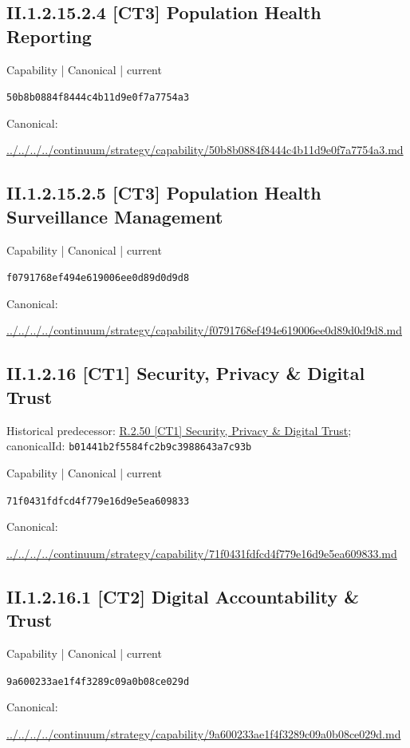 \documentclass[10pt,a4paper]{article}
\begin{document}
\subsection*{II.1.2.15.2.4 [CT3] Population Health Reporting}
\label{element-50b8b0884f8444c4b11d9e0f7a7754a3}
{\small Capability | Canonical | current}\par
\texttt{50b8b0884f8444c4b11d9e0f7a7754a3}\par
Canonical: \par
{\footnotesize\url{../../../../continuum/strategy/capability/50b8b0884f8444c4b11d9e0f7a7754a3.md}}\par
\subsection*{II.1.2.15.2.5 [CT3] Population Health Surveillance Management}
\label{element-f0791768ef494e619006ee0d89d0d9d8}
{\small Capability | Canonical | current}\par
\texttt{f0791768ef494e619006ee0d89d0d9d8}\par
Canonical: \par
{\footnotesize\url{../../../../continuum/strategy/capability/f0791768ef494e619006ee0d89d0d9d8.md}}\par
\subsection*{II.1.2.16 [CT1] Security, Privacy \& Digital Trust}
Historical predecessor: \hyperref[element-b01441b2f5584fc2b9c3988643a7c93b]{R.2.50 [CT1] Security, Privacy \& Digital Trust}; canonicalId: \texttt{b01441b2f5584fc2b9c3988643a7c93b}\par
\label{element-71f0431fdfcd4f779e16d9e5ea609833}
{\small Capability | Canonical | current}\par
\texttt{71f0431fdfcd4f779e16d9e5ea609833}\par
Canonical: \par
{\footnotesize\url{../../../../continuum/strategy/capability/71f0431fdfcd4f779e16d9e5ea609833.md}}\par
\subsection*{II.1.2.16.1 [CT2] Digital Accountability \& Trust}
\label{element-9a600233ae1f4f3289c09a0b08ce029d}
{\small Capability | Canonical | current}\par
\texttt{9a600233ae1f4f3289c09a0b08ce029d}\par
Canonical: \par
{\footnotesize\url{../../../../continuum/strategy/capability/9a600233ae1f4f3289c09a0b08ce029d.md}}\par
\end{document}

